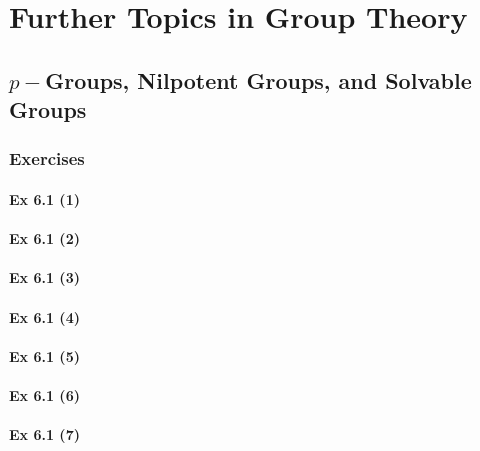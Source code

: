\setcounter{chapter}{0}
\renewcommand{\thechapter}{6}
\chapter{Further Topics in Group Theory}\label{ch:6}
\setcounter{equation}{0}	        %

\section{$p-$Groups, Nilpotent Groups, and Solvable Groups}\label{sec:6.1}	
\subsection*{Exercises}\label{sec:6.1_Exercises}

\subsubsection{Ex 6.1 (1)}\label{sec:Ex_6.1.1}

\subsubsection{Ex 6.1 (2)}\label{sec:Ex_6.1.2}

\subsubsection{Ex 6.1 (3)}\label{sec:Ex_6.1.3}

\subsubsection{Ex 6.1 (4)}\label{sec:Ex_6.1.4}

\subsubsection{Ex 6.1 (5)}\label{sec:Ex_6.1.5}

\subsubsection{Ex 6.1 (6)}\label{sec:Ex_6.1.6}

\subsubsection{Ex 6.1 (7)}\label{sec:Ex_6.1.7}

